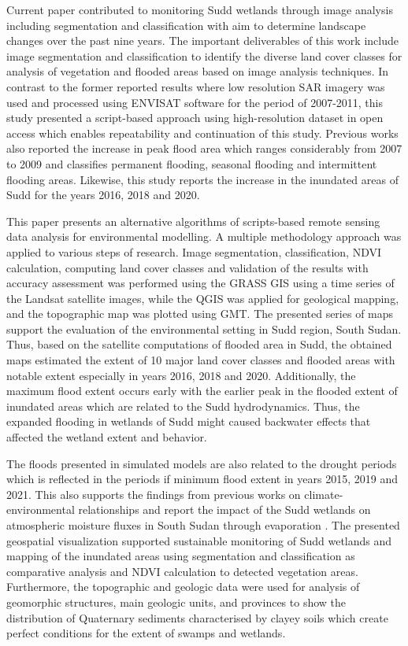 \documentclass[analytics,article,submit,pdftex,moreauthors]{Definitions/mdpi}
\begin{document}
Current paper contributed to monitoring Sudd wetlands through image analysis including segmentation and classification with aim to determine landscape changes over the past nine years. The important deliverables of this work include image segmentation and classification to identify the diverse land cover classes for analysis of vegetation and flooded areas based on image analysis techniques. In contrast to the former reported results \cite{WILUSZ2017205} where low resolution SAR imagery was used and processed using ENVISAT software for the period of 2007-2011, this study presented a script-based approach using high-resolution dataset in open access which enables repeatability and continuation of this study. Previous works also reported the increase in peak flood area which ranges considerably from 2007 to 2009 and classifies permanent flooding, seasonal flooding and intermittent flooding areas. Likewise, this study reports the increase in the inundated areas of Sudd for the years 2016, 2018 and 2020. 

This paper presents an alternative algorithms of scripts-based remote sensing data analysis for environmental modelling. A multiple methodology approach was applied to various steps of research. Image segmentation, classification, NDVI calculation, computing land cover classes and validation of the results with accuracy assessment was performed using the GRASS GIS using a time series of the Landsat satellite images, while the QGIS was applied for geological mapping, and the topographic map was plotted using GMT. The presented series of maps support the evaluation of the environmental setting in Sudd region, South Sudan. Thus, based on the satellite computations of flooded area in Sudd, the obtained maps estimated the extent of 10 major land cover classes and flooded areas with notable extent especially in years 2016, 2018 and 2020. Additionally, the maximum flood extent occurs early with  the earlier peak in the flooded extent  of inundated areas which are related to the Sudd hydrodynamics. Thus, the expanded flooding in wetlands of Sudd might caused backwater effects that affected the wetland extent and behavior. 

The floods presented in simulated models are also related to the drought periods which is reflected in the periods if minimum flood extent in years 2015, 2019 and 2021. This also supports the findings from previous works on climate-environmental relationships and report the impact of the Sudd wetlands on atmospheric moisture fluxes in South Sudan through evaporation \cite{Mohamed}. The presented geospatial visualization supported sustainable monitoring of Sudd wetlands and mapping of the inundated areas using segmentation and classification as comparative analysis and NDVI calculation to detected vegetation areas. Furthermore, the topographic and geologic data were used for analysis of geomorphic structures, main geologic units, and provinces to show the distribution of Quaternary sediments characterised by clayey soils which create perfect conditions for the extent of swamps and wetlands. 
\end{document}
